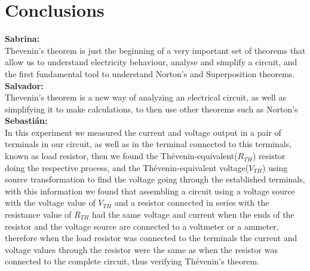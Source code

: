 \documentclass[letterpaper]{article}
\begin{document}
\section{Conclusions}
{\large\textbf{Sabrina:}}\\
Thevenin’s theorem is just the beginning of a very important set of theorems that allow us to understand electricity behaviour, analyse and simplify a circuit, and the first fundamental tool to understand Norton’s and Superposition theorems.
\\[1.2ex]
{\large\textbf{Salvador:}}\\
Thevenin's theorem is a new way of analyzing an electrical circuit, as well as simplifying it to make calculations, to then use other theorems such as Norton's
\\[1.2ex]
{\large\textbf{Sebastián:}}\\
In this experiment we measured the current and voltage output in a pair of terminals in our
circuit, as well as in the terminal connected to this terminals, known as load resistor, then we found the Thévenin-equivalent($R_{TH}$) resistor doing the respective process, and the
Thévenin-equivalent voltage($V_{TH}$) using source transformation to find the voltage going through the
established terminals, with this information we found that assembling a circuit using a voltage
source with the voltage value of $V_{TH}$ and a resistor connected in series with the resistance
value of $R_{TH}$ had the same voltage and current when the ends of the resistor and the voltage
source are connected to a voltmeter or a ammeter, therefore when the load resistor was connected
to the terminals the current and voltage values through the resistor were the same as when the
resistor was connected to the complete circuit, thus verifying Thévenin's theorem.
\end{document}
